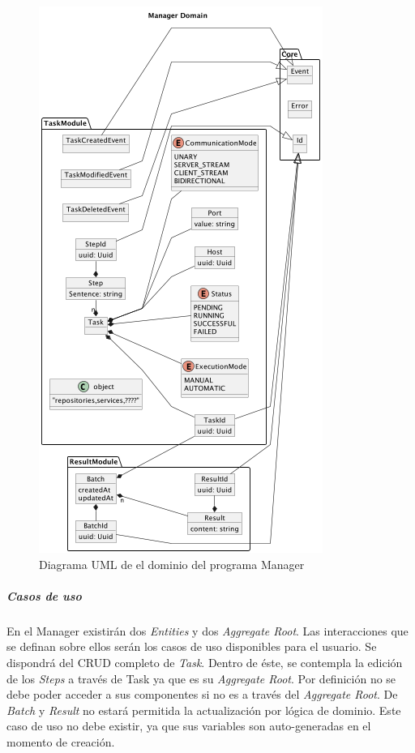 \begin{figure}[H]
    \centering
    \includegraphics[height=0.5\textheight]{./part/Proyecto_ejecutivo/memoria_descriptiva/descripcionDelProyecto/manager/uml/managerDomain}
    \caption{Diagrama UML de el dominio del programa Manager}\label{fig:Diagrama UML de el dominio de manager}
\end{figure}

\subparagraph{Casos de uso}

En el Manager existirán dos \textit{Entities} y dos \textit{Aggregate Root}.
Las interacciones que se definan sobre ellos serán los casos de uso disponibles para el usuario.
Se dispondrá del \gls{CRUD} completo de \textit{Task}.
Dentro de éste, se contempla la edición de los \textit{Steps} a través de Task ya que es su \textit{Aggregate Root}.
Por definición no se debe poder acceder a sus componentes si no es a través del \textit{Aggregate Root}.
De \textit{Batch} y \textit{Result} no estará permitida la actualización por lógica de dominio.
Este caso de uso no debe existir, ya que sus variables son auto-generadas en el momento de creación.

